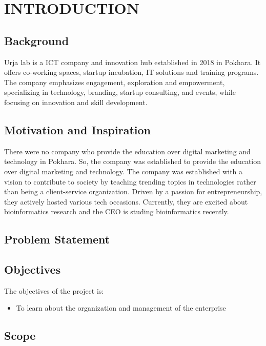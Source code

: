 \setcounter{page}{1}
\chapter{INTRODUCTION}
    \section{Background}
    Urja lab is a ICT company and innovation hub established in 2018 in Pokhara. It offers co-working spaces, startup incubation, IT solutions and training programs. The company emphasizes engagement, exploration and empowerment, specializing in technology, branding, startup consulting, and events, while focusing on innovation and skill development.   

    \section{Motivation and Inspiration}
    There were no company who provide the education over digital marketing and technology in Pokhara. So, the company was established to provide the education over digital marketing and technology. The company was established with a vision to contribute to society by teaching trending topics in technologies rather than being a client-service organization. Driven by a passion for entrepreneurship, they actively hosted various tech occasions. Currently, they are excited about bioinformatics research and the CEO is studing bioinformatics recently.
    \section{Problem Statement}
    
    
    
    \section{Objectives}
    The objectives of the project is:
        \begin{itemize}
        \setlength\itemsep{1.5pt}
        \item To learn about the organization and management of the enterprise

        \end{itemize}


    \section{Scope}
    

